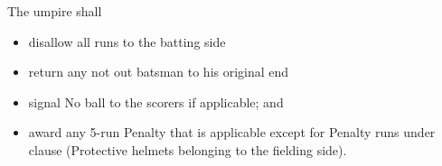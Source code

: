 \documentclass[12pt]{article}
\begin{document}
\vspace{\baselineskip}
{\fontsize{9pt}{10.8pt}\selectfont The umpire shall\par}\par


\vspace{\baselineskip}
\begin{itemize}
	\item {\fontsize{9pt}{10.8pt}\selectfont disallow all runs to the batting side\par}\par


\vspace{\baselineskip}
	\item {\fontsize{9pt}{10.8pt}\selectfont return any not out batsman to his original end\par}\par


\vspace{\baselineskip}
	\item {\fontsize{9pt}{10.8pt}\selectfont signal No ball to the scorers if applicable; and\par}
\end{itemize}\par


\vspace{\baselineskip}

\vspace{\baselineskip}

\vspace{\baselineskip}

\vspace{\baselineskip}

\vspace{\baselineskip}

\vspace{\baselineskip}
\begin{Center}
{\fontsize{8pt}{9.6pt}\par}
\end{Center}\par


\vspace{\baselineskip}

\vspace{\baselineskip}
\begin{itemize}
	\item {\fontsize{9pt}{10.8pt}\selectfont award any 5-run Penalty that is applicable except for Penalty runs under clause (Protective helmets belonging to the fielding side).\par}
\end{itemize}\par
\end{document}
